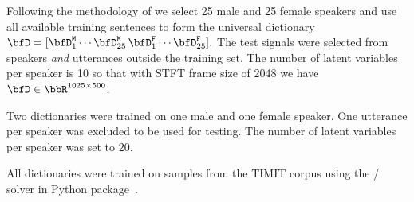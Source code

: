 \begin{figure}[h]
    \begin{fullwidth}
    \centering
        \hfill
    \label{fig:separake:results}
    \end{fullwidth}
\end{figure}


 Following the methodology of  we select 25 male and 25 female speakers
and use all available training sentences to form the universal dictionary
$
    \mD = [\mD_1^\mathtt{M}\cdots \mD_{25}^\mathtt{M}\,\mD_{1}^\mathtt{F}\cdots\mD_{25}^\mathtt{F}].
$
The test signals were selected from speakers \emph{and} utterances outside the training set.
The number of latent variables per speaker is 10 so that with STFT frame size of 2048 we have $\mD\in\R^{1025\times500}$.

Two dictionaries were trained on one male and one female speaker.
One utterance per speaker was excluded to be used for testing.
The number of latent variables per speaker was set to $20$.

\mynewline
All dictionaries were trained on samples from the TIMIT corpus  using the \NMF/ solver in  Python package~.

